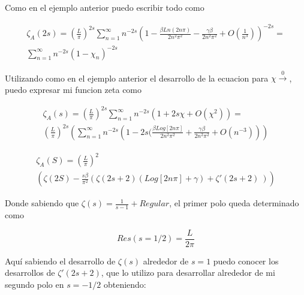 Como en el ejemplo anterior puedo escribir todo como

\begin{equation}
\begin{array}{c}
    \zeta _A (2 s) = \left( \frac{L}{\pi} \right)  ^{2 s} 
    \sum _{n=1} ^{\infty} n ^{- 2  s}
    \left(
    1 - \frac{\beta Ln(2 n \pi)}{2 n^2 \pi ^2} - \frac{\gamma \beta}{2 n^2 \pi ^2 } +
    O(\frac{1}{n^3})  \right) ^{-2 s} = \\
    \sum _{n=1} ^{\infty} n ^{-2 s} 
    \left(
    1 -\chi _n \right) ^{- 2 s}
\end{array}
\end{equation}

Utilizando como en el ejemplo anterior el desarrollo de la ecuacion para $\chi \xrightarrow 0$, puedo expresar mi funcion zeta como 


\begin{equation}
\begin{array}{c}
    \zeta _A (s) = ( \frac{L}{\pi} ) ^{2 s}
    \sum _{n=1} ^{\infty} 
    n ^{-2s}
    \left(
    1 + 2 s \chi + O(\chi ^2)
    \right) =  \\
    ( \frac{L}{\pi} ) ^{2 s}
    \left(
    \sum _{n=1} ^{\infty} n ^{-2 s} 
    \left(
    1 - 2s (
    \frac{\beta Log[2 n \pi]}{2 n ^2 \pi ^2} + 
    \frac{\gamma \beta}{2 n ^2 \pi ^2} +
    O (n ^{-3}  )
    \right)
    \right)
\end{array}
\end{equation}


\begin{equation}
\begin{array}{c}
    \zeta _A (S) = 
    \left( \frac{L }{ \pi } \right) ^{2}  \\
    \left(
    \zeta (2 S) -
	\frac{ s \beta}{ \pi ^2}
	\left(
	\zeta (2s+2)  ( Log[2 n \pi ] + \gamma) +
	\zeta '(2s+2) \
	\right)
    \right)
\end{array}
\end{equation}

Donde sabiendo que $\zeta(s) = \frac{1}{s-1} + Regular$, el primer polo queda determinado como

\begin{equation}
    Res(s=1/2) = \frac{L}{2 \pi}    
\end{equation}

Aquí sabiendo el desarrollo de $\zeta(s)$ alrededor de $s=1$ puedo conocer los desarrollos de $\zeta'(2s+2)$, que lo utilizo para desarrollar alrededor de mi segundo polo en $s = -1/2$ obteniendo:

